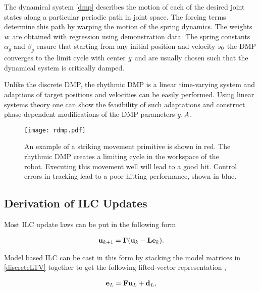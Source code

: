 The dynamical system \eqref{dmp} describes the motion of each of the desired joint states along a particular periodic path in joint space. The forcing terms determine this path by warping the motion of the spring dynamics. The weights $w$ are obtained with regression using demonstration data. The spring constants $\alpha_{g}$ and $\beta_{g}$ ensure that starting from any initial position and velocity $s_0$ the DMP converges to the limit cycle with center $g$ and are usually chosen such that the dynamical system is critically damped.

Unlike the discrete DMP, the rhythmic DMP is a linear time-varying system and adaptions of target positions and velocities can be easily performed. Using linear systems theory one can show the feasibility of such adaptations and construct phase-dependent modifications of the DMP parameters $g,A$.

\begin{figure}
\center
\texttt{[image: rdmp.pdf]}
\caption{An example of a striking movement primitive is shown in red. The rhythmic DMP creates a limiting cycle in the workspace of the robot. Executing this movement well will lead to a good hit. Control errors in tracking lead to a poor hitting performance, shown in blue.}
\label{rdmp}
\end{figure}

\subsection{Derivation of ILC Updates}

Most ILC update laws can be put in the following form

\begin{equation}
\begin{aligned}
\boldsymbol{\mathrm{u}}_{k+1} = \boldsymbol{\mathrm{\Gamma}}(\boldsymbol{\mathrm{u}}_{k} - \boldsymbol{\mathrm{L}}\boldsymbol{\mathrm{e}}_{k}).
\end{aligned}
\label{ILCupdateForm}
\end{equation}

\noindent Model based ILC can be cast in this form by stacking the model matrices in \eqref{discreteLTV} together to get the following lifted-vector representation \cite{Bristow06}, \cite{Schoellig12}

\begin{equation}
\begin{aligned}
\boldsymbol{\mathrm{e}}_L &= \boldsymbol{\mathrm{F}}\boldsymbol{\mathrm{u}}_L + \boldsymbol{\mathrm{d}}_L, \\
\end{aligned}
\label{liftedLTV}
\end{equation}

